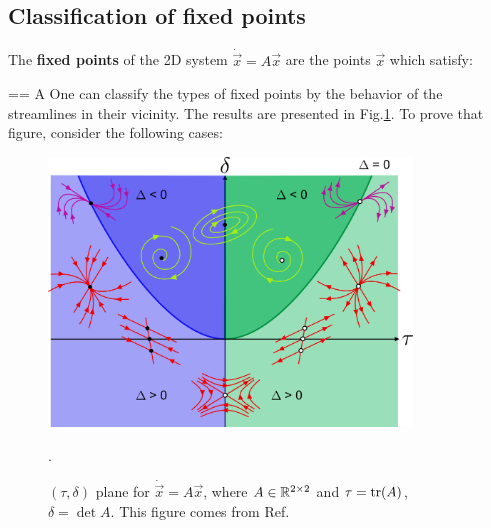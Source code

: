 \subsection{Classification of fixed points}

The {\bf fixed points} of the 2D system $\dot{\vec{x}}=A\vec{x}$ are 
the points $\vec{x}$ which satisfy:

== A
\eeq
One can classify the types of fixed points by the behavior
of the streamlines in their vicinity.
The results are 
presented in Fig.\ref{fig-wiki-pp}.
To prove that figure, consider the following cases:


\begin{figure}[h!]
\centering
\includegraphics[width=3.8in]
{dynamical-sys/Phase_plane_nodes.png}
\caption{
$(\tau, \delta)$ plane
for $\dot{\vec{x}} = A \vec{x}$, where $A\in  { \mathbb{R}}^{2\times 2}$ and  $\tau={\rm tr }(A)$, $\delta=\det{A}$. This
figure  comes from Ref.\cite{wiki-phase-plane}}.
\label{fig-wiki-pp}
\end{figure}

